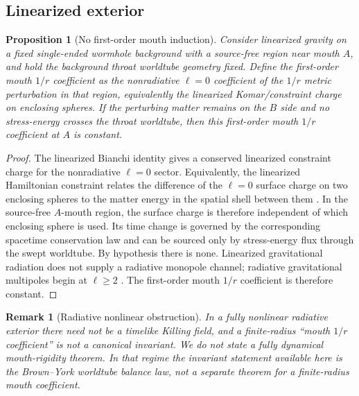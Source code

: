\documentclass[aps,prd,10pt,onecolumn,nofootinbib,superscriptaddress,floatfix]{revtex4-2}
\newtheorem{proposition}{Proposition}
\newtheorem{remark}{Remark}
\begin{document}
\subsection{Linearized exterior}

\begin{proposition}[No first-order mouth induction]
\label{prop:linearized}
Consider linearized gravity on a fixed single-ended wormhole background with a
source-free region near mouth $A$, and hold the background throat worldtube
geometry fixed.  Define the first-order mouth $1/r$ coefficient as the nonradiative
$\ell=0$ coefficient of the $1/r$ metric perturbation in that region,
equivalently the linearized Komar/constraint charge on enclosing spheres.  If
the perturbing matter remains on the $B$ side and no stress-energy crosses the
throat worldtube, then this first-order mouth $1/r$ coefficient at $A$ is
constant.
\end{proposition}

\begin{proof}
The linearized Bianchi identity gives a conserved linearized constraint charge
for the nonradiative $\ell=0$ sector.  Equivalently, the linearized Hamiltonian
constraint relates the difference of the $\ell=0$ surface charge on two
enclosing spheres to the matter energy in the spatial shell between them
\cite{ReggeTeitelboim1974SurfaceIntegrals,AbbottDeser1982Stability}.  In the
source-free $A$-mouth region, the surface charge is therefore independent of
which enclosing sphere is used.  Its time change is governed by the
corresponding spacetime conservation law and can be sourced only by
stress-energy flux through the swept worldtube.  By hypothesis there is none.
Linearized gravitational radiation does not supply a radiative monopole
channel; radiative gravitational multipoles begin at $\ell\ge2$
\cite{Thorne1980Multipole}.  The first-order mouth $1/r$ coefficient is
therefore constant.
\end{proof}

\begin{remark}[Radiative nonlinear obstruction]
In a fully nonlinear radiative exterior there need not be a timelike Killing
field, and a finite-radius ``mouth $1/r$ coefficient'' is not a canonical
invariant.  We do not state a fully dynamical mouth-rigidity theorem.  In that
regime the invariant statement available here is the Brown--York worldtube
balance law, not a separate theorem for a finite-radius mouth coefficient.
\end{remark}
\end{document}
